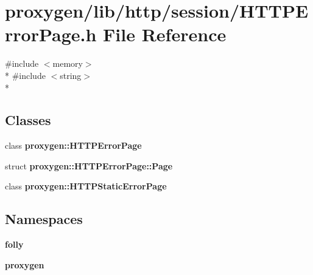 \section{proxygen/lib/http/session/\+H\+T\+T\+P\+Error\+Page.h File Reference}
\label{HTTPErrorPage_8h}
{\ttfamily \#include $<$memory$>$}\\*
{\ttfamily \#include $<$string$>$}\\*
\subsection*{Classes}
\begin{DoxyCompactItemize}
\item 
class {\bf proxygen\+::\+H\+T\+T\+P\+Error\+Page}
\item 
struct {\bf proxygen\+::\+H\+T\+T\+P\+Error\+Page\+::\+Page}
\item 
class {\bf proxygen\+::\+H\+T\+T\+P\+Static\+Error\+Page}
\end{DoxyCompactItemize}
\subsection*{Namespaces}
\begin{DoxyCompactItemize}
\item 
 {\bf folly}
\item 
 {\bf proxygen}
\end{DoxyCompactItemize}
